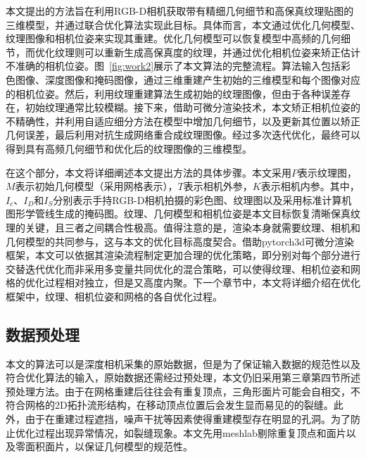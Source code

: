 本文提出的方法旨在利用RGB-D相机获取带有精细几何细节和高保真纹理贴图的三维模型，并通过联合优化算法实现此目标。具体而言，本文通过优化几何模型、纹理图像和相机位姿来实现其重建。优化几何模型可以恢复模型中高频的几何细节，而优化纹理则可以重新生成高保真度的纹理，并通过优化相机位姿来矫正估计不准确的相机位姿。图~\ref{fig:work2}展示了本文算法的完整流程。算法输入包括彩色图像、深度图像和掩码图像，通过三维重建产生初始的三维模型和每个图像对应的相机位姿。然后，利用纹理重建算法生成初始的纹理图像，但由于各种误差存在，初始纹理通常比较模糊。接下来，借助可微分渲染技术，本文矫正相机位姿的不精确性，并利用自适应细分方法在模型中增加几何细节，以及更新其位置以矫正几何误差，最后利用对抗生成网络重合成纹理图像。经过多次迭代优化，最终可以得到具有高频几何细节和优化后的纹理图像的三维模型。\par

在这个部分，本文将详细阐述本文提出方法的具体步骤。本文采用$P$表示纹理图，$M$表示初始几何模型（采用网格表示），$T$表示相机外参，$K$表示相机内参。其中，$I_c$、$I_D$和$I_S$分别表示手持RGB-D相机拍摄的彩色图、纹理图以及采用标准计算机图形学管线生成的掩码图。纹理、几何模型和相机位姿是本文目标恢复清晰保真纹理的关键，且三者之间耦合性极高。值得注意的是，渲染本身就需要纹理、相机和几何模型的共同参与，这与本文的优化目标高度契合。借助pytorch3d可微分渲染框架，本文可以依据其渲染流程制定更加合理的优化策略，即分别对每个部分进行交替迭代优化而非采用多变量共同优化的混合策略，可以使得纹理、相机位姿和网格的优化过程相对独立，但是又高度内聚。下一个章节中，本文将详细介绍在优化框架中，纹理、相机位姿和网格的各自优化过程。\par


\subsection{数据预处理}
本文的算法可以是深度相机采集的原始数据，但是为了保证输入数据的规范性以及符合优化算法的输入，原始数据还需经过预处理，本文仍旧采用第三章第四节所述预处理方法。由于在网格重建后往往会有重复顶点，三角形面片可能会自相交，不符合网格的2D拓扑流形结构，在移动顶点位置后会发生显而易见的的裂缝。此外，由于在重建过程遮挡，噪声干扰等因素使得重建模型存在明显的孔洞。为了防止优化过程出现异常情况，如裂缝现象。本文先用meshlab剔除重复顶点和面片以及零面积面片，以保证几何模型的规范性。


